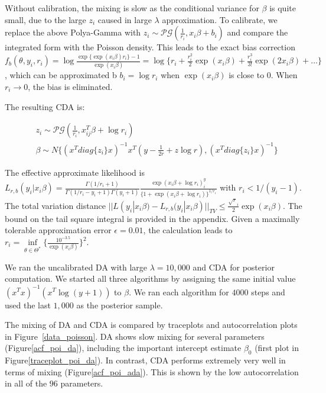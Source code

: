 \documentclass[10pt]{article}
\newcommand{\xbeta}{ x_i \beta}
\newcommand{\xbetaij}{ x_{ij}^T \beta}
\begin{document}
Without calibration, the mixing is slow as the conditional variance for $\beta$ is quite small, due to the large $z_i$ caused in large $\lambda$ approximation. To calibrate, we replace the above Polya-Gamma with $z_i \sim \mathcal{PG} ( \frac{1}{r_i}, \xbeta + b_i )$ and compare the integrated form with the Poisson density. This leads to the exact bias correction $f_b(\theta,y_{i},r_{i})= \log \frac{\exp\{\exp(\xbeta)r_i\}-1}{\exp(\xbeta)}= \log \{ r_i+ \frac{r_i^2}{2}\exp(\xbeta)+ \frac{r_i^3}{3!}  \exp(2\xbeta)+\ldots \} $, which can be approximated b  $b_i = \log r_i$ when $\exp(\xbeta)$ is close to $0$. When $r_i\rightarrow 0$, the bias is eliminated.

The resulting CDA is:


\begin{equation}\begin{aligned}
		& z_{i}\sim \mathcal{PG}(\frac{1}{r_{i}}, \xbetaij+ \log r_{i}) \\
	& \beta \sim N\{  (x^T diag\{z_{i}\}x)^{-1}   x^T (y-\frac{1}{2 r} + z \log r)  ,  (x^T diag\{z_{i}\}x)^{-1}   \}
\end{aligned}\end{equation}

The effective approximate likelihood is $L_{r,b} (y_i| \xbeta) =\frac{\Gamma(1/r_i+1)}{\Gamma(1/r_i-y_i+1)\Gamma(y_i+1)}\frac{\exp ( \xbeta+\log r_i)^y_i}{\{1+ \exp ( \xbeta +\log r_i)\}^{1/r_i}}$ with $r_i< 1/(y_i -1)$. The total variation distance $||L (y_i| \xbeta) - L_{r,b} (y_i| \xbeta)||_{TV}\le \frac{\sqrt r_i }{2}\exp (\xbeta)$. The bound on the tail square integral is provided in the appendix. Given a maximally tolerable approximation error $\epsilon=0.01$, the calculation leads to  $r_{i} = \underset{\theta \in \varTheta^*}{\inf}  \{\frac{10^{-3.5} }{\exp(\xbeta)}\}^2   $.

We ran the uncalibrated DA with large $\lambda=10,000$ and CDA for posterior computation. We started all three algorithms by assigning the same initial value $(x^Tx)^{-1}(x^T \log( y+1))$ to ${\beta}$. We ran each algorithm for $4000$ steps and used the last $1,000$ as the posterior sample.

The mixing of DA and CDA is compared by traceplots and autocorrelation plots in Figure~\ref{data_poisson}. DA shows slow mixing for several parameters (Figure\ref{acf_poi_da}), including the important intercept estimate $\beta_0$ (first plot in Figure\ref{traceplot_poi_da}). In contrast, CDA performs extremely very well in terms of mixing (Figure\ref{acf_poi_ada}). This is shown by the low autocorrelation in all of the $96$ parameters. 
\end{document}
